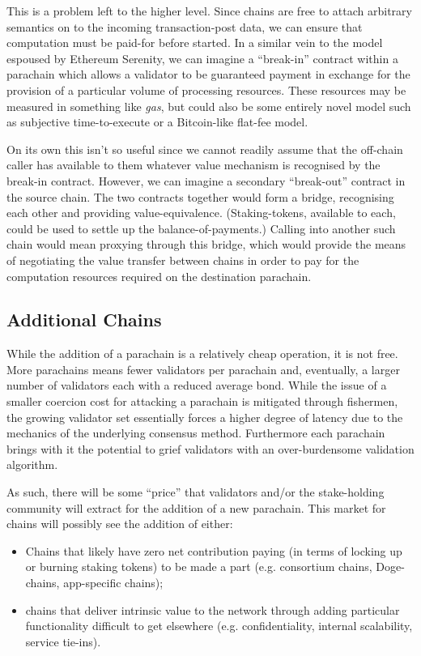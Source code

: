 \documentclass{beamer}
\makeatletter
\newcommand*\eg{e.g.\@\xspace}
\makeatother
\begin{document}
\begin{frame}
This is a problem left to the higher level. Since chains are free to attach arbitrary semantics on to the incoming transaction-post data, we can ensure that computation must be paid-for before started. In a similar vein to the model espoused by Ethereum Serenity, we can imagine a ``break-in'' contract within a parachain which allows a validator to be guaranteed payment in exchange for the provision of a particular volume of processing resources. These resources may be measured in something like \textit{gas}, but could also be some entirely novel model such as subjective time-to-execute or a Bitcoin-like flat-fee model.

 On its own this isn't so useful since we cannot readily assume that the off-chain caller has available to them whatever value mechanism is recognised by the break-in contract. However, we can imagine a secondary ``break-out'' contract in the source chain. The two contracts together would form a bridge, recognising each other and providing value-equivalence. (Staking-tokens, available to each, could be used to settle up the balance-of-payments.) Calling into another such chain would mean proxying through this bridge, which would provide the means of negotiating the value transfer between chains in order to pay for the computation resources required on the destination parachain.

\subsection{Additional Chains}
\label{additional-chains}

 While the addition of a parachain is a relatively cheap operation, it is not free. More parachains means fewer validators per parachain and, eventually, a larger number of validators each with a reduced average bond. While the issue of a smaller coercion cost for attacking a parachain is mitigated through fishermen, the growing validator set essentially forces a higher degree of latency due to the mechanics of the underlying consensus method. Furthermore each parachain brings with it the potential to grief validators with an over-burdensome validation algorithm.

 As such, there will be some ``price'' that validators and/or the stake-holding community will extract for the addition of a new parachain. This market for chains will possibly see the addition of either:

\begin{itemize}
\item Chains that likely have zero net contribution paying (in terms of locking up or burning staking tokens) to be made a part (\eg consortium chains, Doge-chains, app-specific chains);
\item chains that deliver intrinsic value to the network through adding particular functionality difficult to get elsewhere (\eg confidentiality, internal scalability, service tie-ins).
\end{itemize}


\end{frame}
\end{document}
